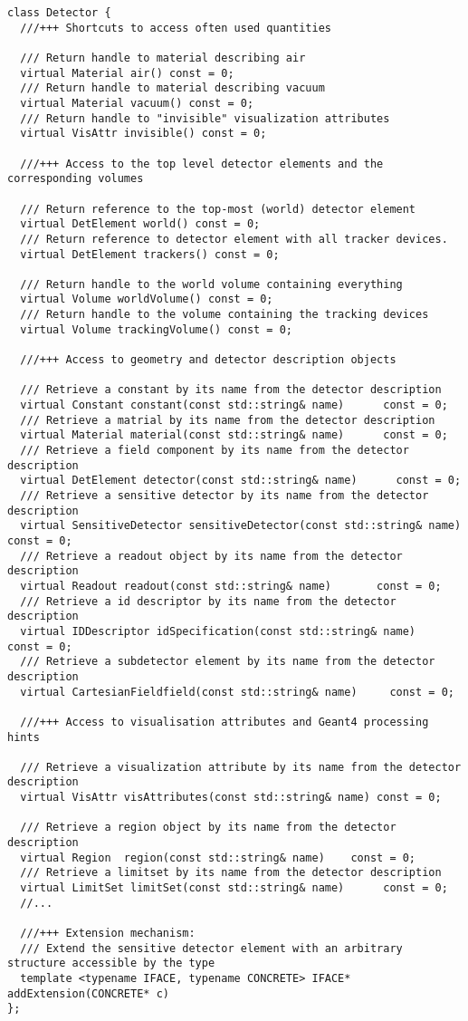 \begin{verbatim}
class Detector {
  ///+++ Shortcuts to access often used quantities

  /// Return handle to material describing air
  virtual Material air() const = 0;
  /// Return handle to material describing vacuum
  virtual Material vacuum() const = 0;
  /// Return handle to "invisible" visualization attributes
  virtual VisAttr invisible() const = 0;

  ///+++ Access to the top level detector elements and the corresponding volumes

  /// Return reference to the top-most (world) detector element
  virtual DetElement world() const = 0;
  /// Return reference to detector element with all tracker devices.
  virtual DetElement trackers() const = 0;

  /// Return handle to the world volume containing everything
  virtual Volume worldVolume() const = 0;
  /// Return handle to the volume containing the tracking devices
  virtual Volume trackingVolume() const = 0;

  ///+++ Access to geometry and detector description objects

  /// Retrieve a constant by its name from the detector description
  virtual Constant constant(const std::string& name)      const = 0;
  /// Retrieve a matrial by its name from the detector description
  virtual Material material(const std::string& name)      const = 0;
  /// Retrieve a field component by its name from the detector description
  virtual DetElement detector(const std::string& name)      const = 0;
  /// Retrieve a sensitive detector by its name from the detector description
  virtual SensitiveDetector sensitiveDetector(const std::string& name) const = 0;
  /// Retrieve a readout object by its name from the detector description
  virtual Readout readout(const std::string& name)       const = 0;
  /// Retrieve a id descriptor by its name from the detector description
  virtual IDDescriptor idSpecification(const std::string& name)   const = 0;
  /// Retrieve a subdetector element by its name from the detector description
  virtual CartesianFieldfield(const std::string& name)     const = 0;

  ///+++ Access to visualisation attributes and Geant4 processing hints

  /// Retrieve a visualization attribute by its name from the detector description
  virtual VisAttr visAttributes(const std::string& name) const = 0;

  /// Retrieve a region object by its name from the detector description
  virtual Region  region(const std::string& name)    const = 0;
  /// Retrieve a limitset by its name from the detector description
  virtual LimitSet limitSet(const std::string& name)      const = 0;
  //...
  
  ///+++ Extension mechanism:
  /// Extend the sensitive detector element with an arbitrary structure accessible by the type
  template <typename IFACE, typename CONCRETE> IFACE* addExtension(CONCRETE* c)
};
\end{verbatim}

